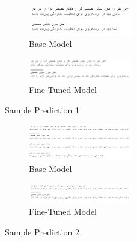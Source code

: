 \documentclass{solutionclass} %
\begin{document}
\begin{figure}[ht!]
	\centering
	\begin{subfigure}[t]{0.5\textwidth}
		\centering
		\includegraphics[width=0.5\textwidth]{img/3/s1b.png}
		\caption{Base Model}
	\end{subfigure}%

	\bigskip
	
	\begin{subfigure}[t]{0.5\textwidth}
		\centering
		\includegraphics[width=0.5\textwidth]{img/3/s1f.png}
		\caption{Fine-Tuned Model}
	\end{subfigure}
	\caption{Sample Prediction 1}
\end{figure}


\begin{figure}[ht!]
	\centering
\begin{subfigure}[t]{0.5\textwidth}
	\centering
	\includegraphics[width=0.5\textwidth]{img/3/s2b.png}
	\caption{Base Model}
\end{subfigure}%

\bigskip

\begin{subfigure}[t]{0.5\textwidth}
	\centering
	\includegraphics[width=0.5\textwidth]{img/3/s2f.png}
	\caption{Fine-Tuned Model}
\end{subfigure}
	\caption{Sample Prediction 2}
\end{figure}
\end{document}
